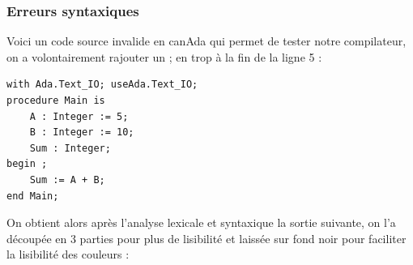 \documentclass[french,a4paper]{article}
\begin{document}
    \subsubsection{Erreurs syntaxiques}

    Voici un code source invalide en canAda qui permet de tester notre compilateur, on a volontairement rajouter un ; en trop à la fin de la ligne 5 :

    \begin{lstlisting}[label={lst:lstlisting17}]
with Ada.Text_IO; useAda.Text_IO;
procedure Main is
    A : Integer := 5;
    B : Integer := 10;
    Sum : Integer;
begin ;
    Sum := A + B;
end Main;
    \end{lstlisting}

    On obtient alors après l'analyse lexicale et syntaxique la sortie suivante, on l'a découpée en 3 parties pour plus de lisibilité et laissée sur fond noir pour faciliter la lisibilité des couleurs :
\end{document}
